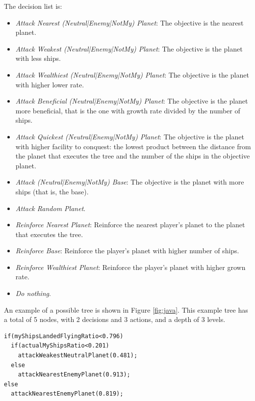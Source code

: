 {The decision list is:

\begin{itemize}
\item {\em Attack Nearest (Neutral|Enemy|NotMy) Planet}: The objective is the nearest planet.
\item {\em Attack Weakest (Neutral|Enemy|NotMy) Planet}: The objective is the planet with less ships.
\item {\em Attack Wealthiest (Neutral|Enemy|NotMy) Planet}: The objective is the planet with higher lower rate.
\item {\em Attack Beneficial (Neutral|Enemy|NotMy) Planet}: The objective is the planet more beneficial, that is the one with growth rate divided by the number of ships.
\item {\em Attack Quickest (Neutral|Enemy|NotMy) Planet}: The objective is the planet with higher facility to conquest: the lowest product between the distance from the planet that executes the tree and the number of the ships in the objective planet.
\item {\em Attack (Neutral|Enemy|NotMy) Base}: The objective is the planet with more ships (that is, the base).
\item {\em  Attack Random Planet}.
\item {\em Reinforce Nearest Planet}: Reinforce the nearest player's planet to the planet that executes the tree.
\item {\em Reinforce Base}: Reinforce the player's planet with higher number of ships.
\item {\em Reinforce Wealthiest Planet}: Reinforce the player's planet with higher grown rate.
\item {\em Do nothing}.


\end{itemize}

An example of a possible tree is shown in Figure \ref{fig:java}. This example tree has a total of 5 nodes, with 2 decisions and 3 actions, and a depth of 3 levels.


\newsavebox{\javaboxrts}
\begin{lrbox}{\javaboxrts}
\begin{minipage}{10cm}
\begin{lstlisting}
if(myShipsLandedFlyingRatio<0.796)
  if(actualMyShipsRatio<0.201)
    attackWeakestNeutralPlanet(0.481);
  else
    attackNearestEnemyPlanet(0.913);
else
  attackNearestEnemyPlanet(0.819);
\end{lstlisting}
\end{minipage}
\end{lrbox}

}
